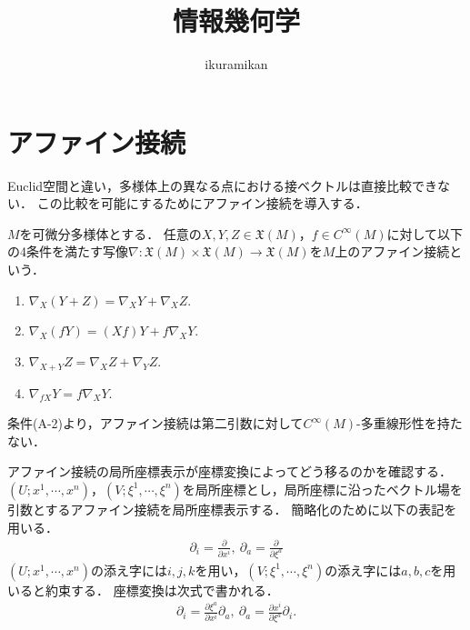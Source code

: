 \documentclass{MochiMochi}
\title{情報幾何学}
\author{ikuramikan}
\newcommand{\vf}[1]{\mathfrak{X}(#1)}
\begin{document}
\maketitle



\section{アファイン接続}
Euclid空間と違い，多様体上の異なる点における接ベクトルは直接比較できない．
この比較を可能にするためにアファイン接続を導入する．
\begin{defn}
$M$を可微分多様体とする．
任意の$X, Y, Z \in \vf{M}$，$f\in C^{\infty}(M)$に対して以下の4条件を満たす写像$\nabla:\vf{M}\times \vf{M}\to\vf{M}$を$M$上のアファイン接続という．
\begin{enumerate}[label=(A-\arabic*)]
    \item $\nabla_{X}(Y+Z) = \nabla_{X} Y + \nabla_{X} Z.$
    \item $\nabla_{X}(fY) = (Xf)Y+ f \nabla_{X} Y.$
    \item $\nabla_{X+Y} Z = \nabla_X Z + \nabla_Y Z.$
    \item $\nabla_{fX} Y = f\nabla_X Y.$
\end{enumerate}
\end{defn}
\begin{rem}
条件(A-2)より，アファイン接続は第二引数に対して$C^\infty(M)$-多重線形性を持たない．
\end{rem}





アファイン接続の局所座標表示が座標変換によってどう移るのかを確認する．
$(U;x^1, \cdots, x^n)$，$(V;\xi^1, \cdots, \xi^n)$を局所座標とし，局所座標に沿ったベクトル場を引数とするアファイン接続を局所座標表示する．
簡略化のために以下の表記を用いる．
\begin{align}
    \partial_i = \frac{\partial}{\partial x^i}, \ \partial_a = \frac{\partial}{\partial \xi^a}
\end{align}
$(U;x^1, \cdots, x^n)$の添え字には$i,j,k$を用い，$(V;\xi^1, \cdots, \xi^n)$の添え字には$a,b,c$を用いると約束する．
座標変換は次式で書かれる．
\begin{align}
    \partial_i = \frac{\partial \xi^a}{\partial x^i} \partial_a, \ \partial_a = \frac{\partial x^i}{\partial \xi^a} \partial_i.
\end{align}
\end{document}
